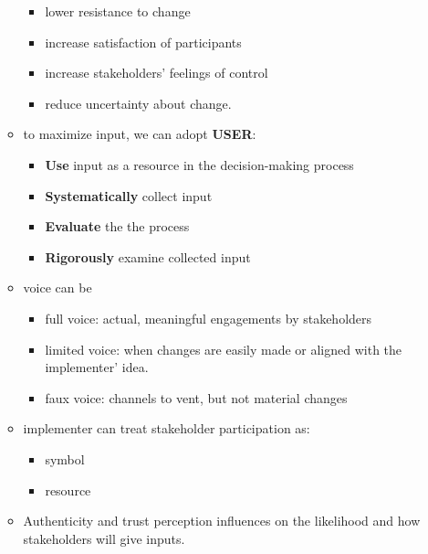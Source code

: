 \documentclass[
]{book}
\begin{document}
\begin{itemize}
\begin{itemize}
    \begin{itemize}
    \item
      lower resistance to change
    \item
      increase satisfaction of participants
    \item
      increase stakeholders' feelings of control
    \item
      reduce uncertainty about change.
    \end{itemize}
  \item
    to maximize input, we can adopt \textbf{USER}:

    \begin{itemize}
    \item
      \textbf{Use} input as a resource in the decision-making process
    \item
      \textbf{Systematically} collect input
    \item
      \textbf{Evaluate} the the process
    \item
      \textbf{Rigorously} examine collected input
    \end{itemize}
  \item
    voice can be

    \begin{itemize}
    \item
      full voice: actual, meaningful engagements by stakeholders
    \item
      limited voice: when changes are easily made or aligned with the implementer' idea.
    \item
      faux voice: channels to vent, but not material changes
    \end{itemize}
  \item
    implementer can treat stakeholder participation as:

    \begin{itemize}
    \item
      symbol
    \item
      resource
    \end{itemize}
  \item
    Authenticity and trust perception influences on the likelihood and how stakeholders will give inputs.
  \end{itemize}
\end{itemize}
\end{document}
